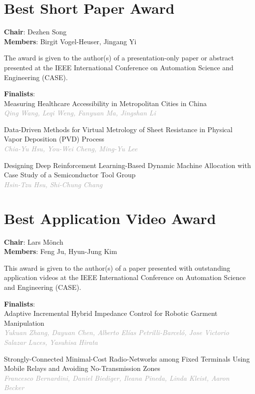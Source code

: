 \documentclass[
	openany, %
	parskip=full, %
	12pt, %
	a4paper, %
]{conferencebooklet} %
\begin{document}
\begin{multicols*}{2}
\normalsize

\section{Best Short Paper Award}
\textbf{Chair}: Dezhen Song \\
\textbf{Members}: Birgit Vogel-Heuser, Jingang Yi

The award is given to the author(s) of a presentation-only paper or abstract presented at the IEEE International Conference on Automation Science and Engineering (CASE).

\textbf{Finalists}: \\
\small Measuring Healthcare Accessibility in Metropolitan Cities in China \\
\footnotesize  \textit{\textcolor{darkgray}{Qing Wang, Leqi Weng, Fanyuan Ma, Jingshan Li}} 

\small Data-Driven Methods for Virtual Metrology of Sheet Resistance in Physical Vapor Deposition (PVD) Process \\
\footnotesize  \textit{\textcolor{darkgray}{Chia-Yu Hsu, You-Wei Cheng, Ming-Yu Lee}} 

\small Designing Deep Reinforcement Learning-Based Dynamic Machine Allocation with Case Study of a Semiconductor Tool Group \\
\footnotesize \textit{\textcolor{darkgray}{Hsin-Tzu Hsu, Shi-Chung Chang}}

\normalsize

\section{Best Application Video Award}
\textbf{Chair}: Lars Mönch \\
\textbf{Members}: Feng Ju, Hyun-Jung Kim 

This award is given to the author(s) of a paper presented with outstanding application videos at the IEEE International Conference on Automation Science and Engineering (CASE).

\textbf{Finalists}: \\
\small Adaptive Incremental Hybrid Impedance Control for Robotic Garment Manipulation \\
\footnotesize \textit{\textcolor{darkgray}{Yukuan Zhang, Dayuan Chen, Alberto Elías Petrilli-Barceló, Jose Victorio Salazar Luces, Yasuhisa Hirata}} 

\small Strongly-Connected Minimal-Cost Radio-Networks among Fixed Terminals Using Mobile Relays and Avoiding No-Transmission Zones \\
\footnotesize \textit{\textcolor{darkgray}{Francesco Bernardini, Daniel Biediger, Ileana Pineda, Linda Kleist, Aaron Becker}}


\end{multicols*}
\end{document}
